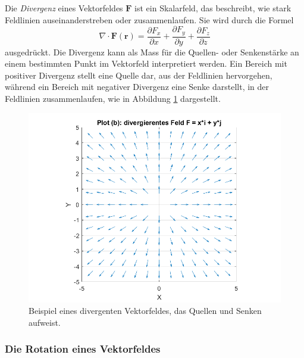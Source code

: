 Die \emph{Divergenz} eines Vektorfeldes $\boldsymbol{F}$ ist ein Skalarfeld,
%
das beschreibt, wie stark Feldlinien auseinanderstreben oder
zusammenlaufen.
Sie wird durch die Formel
\begin{equation*}
\nabla \cdot \boldsymbol{F}(\boldsymbol{r})
=
\frac{\partial F_x}{\partial x}
+
\frac{\partial F_y}{\partial y}
+
\frac{\partial F_z}{\partial z}
\end{equation*}
ausgedrückt.
Die Divergenz kann als Mass für die Quellen- oder Senkenstärke an
einem bestimmten Punkt im Vektorfeld interpretiert werden.
Ein Bereich mit positiver Divergenz stellt eine Quelle dar, aus der
%
Feldlinien hervorgehen, während ein Bereich mit negativer Divergenz
eine Senke darstellt, in der Feldlinien zusammenlaufen, wie in
%
Abbildung \ref{fig:DivergenzAlg} dargestellt.

\begin{figure}
    \centering
    \includegraphics[scale=0.4]{papers/helmholtz/images/divergentes_Feld.png}
    \caption{Beispiel eines divergenten Vektorfeldes, das Quellen und Senken aufweist.}
    \label{fig:DivergenzAlg}
\end{figure}

\subsubsection{Die Rotation eines Vektorfeldes}

